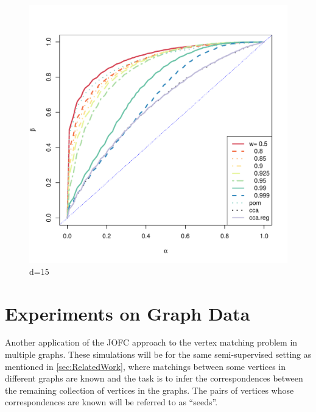 \documentclass[11pt]{article} %
\begin{document}
\begin{center}
\begin{figure}

                \centering
               \includegraphics[scale=0.3]{ROC-d-15.pdf}
                \caption{d=15}
                \label{fig:ROC-d-15}
       
\end{figure}
\end{center}








\section{Experiments on Graph Data}

Another application of  the JOFC approach to  the vertex matching problem in multiple graphs. These simulations will be for the same semi-supervised setting as mentioned in \ref{sec:RelatedWork}, where matchings between some vertices in different graphs are known 
  and the task is to infer the correspondences between the remaining collection of vertices in the graphs. The pairs of vertices whose correspondences are known will be referred to as ``seeds''.
\end{document}
